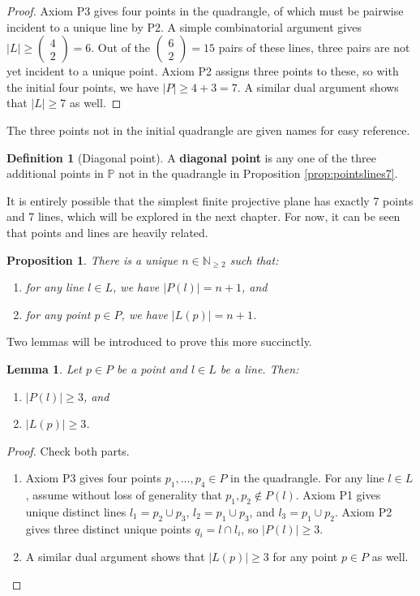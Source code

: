 \documentclass{report}
\newcommand{\N}{\mathbb{N}}
\renewcommand{\P}{\mathbb{P}}
\newcommand{\two}[2]{\begin{pmatrix} #1 \\ #2 \end{pmatrix}}
\newtheorem{lemma}[theorem]{Lemma}
\newtheorem{proposition}[theorem]{Proposition}
\theoremstyle{definition}\newtheorem*{definition}{Definition}
\theoremstyle{definition}\newtheorem*{example}{Example}
\theoremstyle{remark}\newtheorem*{remark}{Remark}
\begin{document}
\begin{proof}
Axiom P3 gives four points in the quadrangle, of which must be pairwise incident to a unique line by P2. A simple combinatorial argument gives $ |L| \ge \two{4}{2} = 6 $. Out of the $ \two{6}{2} = 15 $ pairs of these lines, three pairs are not yet incident to a unique point. Axiom P2 assigns three points to these, so with the initial four points, we have $ |P| \ge 4 + 3 = 7 $. A similar dual argument shows that $ |L| \ge 7 $ as well.
\end{proof}

The three points not in the initial quadrangle are given names for easy reference.

\begin{definition}[Diagonal point]
A \textbf{diagonal point} is any one of the three additional points in $ \P $ not in the quadrangle in Proposition \ref{prop:pointslines7}.
\end{definition}

It is entirely possible that the simplest finite projective plane has exactly 7 points and 7 lines, which will be explored in the next chapter. For now, it can be seen that points and lines are heavily related.

\begin{proposition}
\label{prop:order}
There is a unique $ n \in \N_{\ge 2} $ such that:
\begin{enumerate}[label=(\roman*)]
  \item for any line $ l \in L $, we have $ |P(l)| = n + 1 $, and
  \item for any point $ p \in P $, we have $ |L(p)| = n + 1 $.
\end{enumerate}
\end{proposition}

Two lemmas will be introduced to prove this more succinctly.

\begin{lemma}
\label{lemma:pointslines3}
Let $ p \in P $ be a point and $ l \in L $ be a line. Then:
\begin{enumerate}
  \item $ |P(l)| \ge 3 $, and
  \item $ |L(p)| \ge 3 $.
\end{enumerate}
\end{lemma}

\begin{proof}
Check both parts.
\begin{enumerate}
  \item Axiom P3 gives four points $ p_1, ..., p_4 \in P $ in the quadrangle. For any line $ l \in L $, assume without loss of generality that $ p_1, p_2 \notin P(l) $. Axiom P1 gives unique distinct lines $ l_1 = p_2 \cup p_3 $, $ l_2 = p_1 \cup p_3 $, and $ l_3 = p_1 \cup p_2 $. Axiom P2 gives three distinct unique points $ q_i = l \cap l_i $, so $ |P(l)| \ge 3 $.
  \item A similar dual argument shows that $ |L(p)| \ge 3 $ for any point $ p \in P $ as well.
\end{enumerate}
\end{proof}
\end{document}
